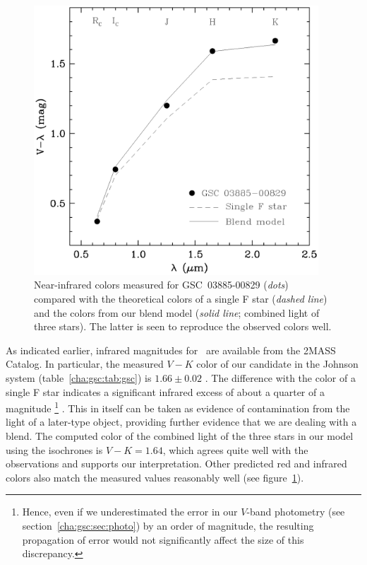 \begin{figure}
\begin{center}
\includegraphics[width=0.95\textwidth]{3_f7}
\caption[Near-infrared colors for \mbox{GSC 03885-00829} and an F star]{Near-infrared colors measured for \mbox{GSC 03885-00829}
  ({\it dots}) compared with the theoretical colors of a single F star
  ({\it dashed line}) and the colors from our blend model ({\it solid line};
  combined light of three stars). The latter is seen to reproduce the
  observed colors well.}
\label{cha:gsc:fig:colors}
\end{center}
\end{figure}

As indicated earlier, infrared magnitudes for \gscOTE\ are
available from the 2MASS Catalog.  In particular, the measured $V-K$
color of our candidate in the Johnson system (table~\ref{cha:gsc:tab:gsc}) is 
$1.66 \pm 0.02$ 
\citep[using transformations from the 2MASS system
by][]{Carpenter:aj:2001a}. The difference with the color of a single F star
indicates a significant infrared excess of about a quarter of a
magnitude%
\footnote{Hence, even if we underestimated the error in our $V$-band
  photometry (see section~\ref{cha:gsc:sec:photo}) by an order of magnitude, the
  resulting propagation of error would not significantly affect the
  size of this discrepancy.}%
. This in itself can be taken as evidence of contamination
from the light of a later-type object, providing further evidence that
we are dealing with a blend. The computed color of the combined light
of the three stars in our model using the
 \citet{Baraffe_Chabrier_Allard:aa:1998a} isochrones
is $V-K = 1.64$, which agrees quite well with the observations and
supports our interpretation. Other predicted red and infrared colors
also match the measured values reasonably well (see figure~\ref{cha:gsc:fig:colors}).

